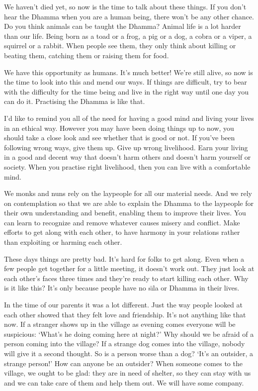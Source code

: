 We haven't died yet, so now is the time to talk about these things. If you don't hear the Dhamma when you are a human being, there won't be any other chance. Do you think animals can be taught the Dhamma? Animal life is a lot harder than our life. Being born as a toad or a frog, a pig or a dog, a cobra or a viper, a squirrel or a rabbit. When people see them, they only think about killing or beating them, catching them or raising them for food.

We have this opportunity as humans. It's much better! We're still alive, so now is the time to look into this and mend our ways. If things are difficult, try to bear with the difficulty for the time being and live in the right way until one day you can do it. Practising the Dhamma is like that.

I'd like to remind you all of the need for having a good mind and living your lives in an ethical way. However you may have been doing things up to now, you should take a close look and see whether that is good or not. If you've been following wrong ways, give them up. Give up wrong livelihood. Earn your living in a good and decent way that doesn't harm others and doesn't harm yourself or society. When you practise right livelihood, then you can live with a comfortable mind.

We monks and nuns rely on the laypeople for all our material needs. And we rely on contemplation so that we are able to explain the Dhamma to the laypeople for their own understanding and benefit, enabling them to improve their lives. You can learn to recognize and remove whatever causes misery and conflict. Make efforts to get along with each other, to have harmony in your relations rather than exploiting or harming each other.

These days things are pretty bad. It's hard for folks to get along. Even when a few people get together for a little meeting, it doesn't work out. They just look at each other's faces three times and they're ready to start killing each other. Why is it like this? It's only because people have no s\={\i}la or Dhamma in their lives.

In the time of our parents it was a lot different. Just the way people looked at each other showed that they felt love and friendship. It's not anything like that now. If a stranger shows up in the village as evening comes everyone will be suspicious: `What's he doing coming here at night?' Why should we be afraid of a person coming into the village? If a strange dog comes into the village, nobody will give it a second thought. So is a person worse than a dog? `It's an outsider, a strange person!' How can anyone be an outsider? When someone comes to the village, we ought to be glad: they are in need of shelter, so they can stay with us and we can take care of them and help them out. We will have some company.

